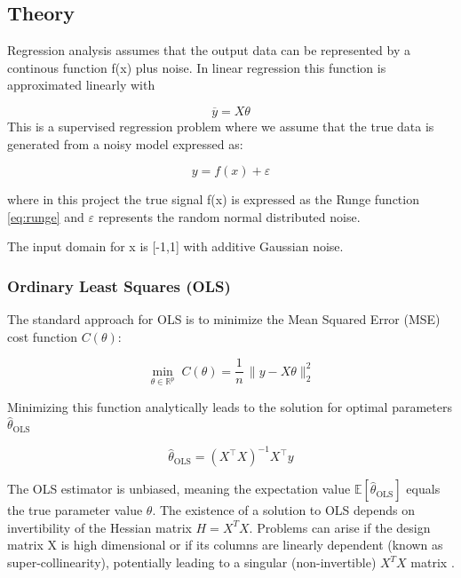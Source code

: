 \documentclass[amssymb,twocolumn,aps,floatfix]{revtex4-2}
\begin{document}
\subsection{Theory}
\label{subsection:theory}
Regression analysis assumes that the output data can be represented by a continous function f(x) plus noise. In linear regression this function is approximated linearly with 

\begin{equation}
    \overline{y} = X \theta
\end{equation}
This is a supervised regression problem where we assume that the true data is generated from a noisy model expressed as: 

\begin{equation}
y = f(x)+\varepsilon
\end{equation}

where in this project the true signal f(x) is expressed as the Runge function \ref{eq:runge} and $\varepsilon$ represents the random normal distributed noise. 

The input domain for x is [-1,1] with additive Gaussian noise. 
\subsubsection{Ordinary Least Squares (OLS)}
\label{subsubsec:ols_theory}

The standard approach for OLS is to minimize the Mean Squared Error (MSE) cost function $C (\theta)$: 

\begin{equation}
    \min_{\theta\in\mathbb{R}^p} \; C(\theta)
= \frac{1}{n}\,\lVert y - X\theta \rVert_2^2
\end{equation}

Minimizing this function analytically leads to the solution for optimal parameters $\hat{\theta}_{\text{OLS}}$

\begin{equation}
\hat{\theta}_{\text{OLS}} = (X^\top X)^{-1} X^\top y
\end{equation}

The OLS estimator is unbiased, meaning the expectation value $\mathbb{E}\!\left[\hat{\theta}_{\text{OLS}}\right]$ equals the true parameter value $\theta$. The existence of a solution to OLS depends on invertibility of the Hessian matrix $H=X^TX$. Problems can arise if the design matrix X is high dimensional or if its columns are linearly dependent (known as super-collinearity), potentially leading to a singular (non-invertible) $X^TX$ matrix \cite{hj_week36}. \\ 
\end{document}
